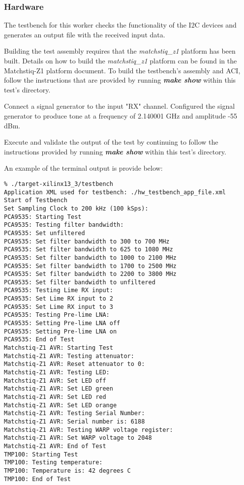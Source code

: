 \documentclass{article}
\begin{document}
\subsubsection*{Hardware}
\begin{flushleft}
The testbench for this worker checks the functionality of the I2C devices and generates an output file with the received input data. \\ \medskip

Building the test assembly requires that the \textit{matchstiq\_z1} platform has been built. Details on how to build the \textit{matchstiq\_z1} platform can be found in the Matchstiq-Z1 platform document. To build the testbench's assembly and ACI, follow the instructions that are provided by running \textbf{\textit{make show}} within this test's directory.\\ \medskip

Connect a signal generator to the input "RX" channel. Configured the signal generator to produce tone at a frequency of 2.140001 GHz and amplitude -55 dBm.\\ \medskip

Execute and validate the output of the test by continuing to follow the instructions provided by running \textbf{\textit{make show}} within this test's directory.\\ \medskip

An example of the terminal output is provide below:

\begin{lstlisting}
% ./target-xilinx13_3/testbench                 
Application XML used for testbench: ./hw_testbench_app_file.xml
Start of Testbench
Set Sampling Clock to 200 kHz (100 kSps): 
PCA9535: Starting Test 
PCA9535: Testing filter bandwidth: 
PCA9535: Set unfiltered
PCA9535: Set filter bandwidth to 300 to 700 MHz
PCA9535: Set filter bandwidth to 625 to 1080 MHz
PCA9535: Set filter bandwidth to 1000 to 2100 MHz
PCA9535: Set filter bandwidth to 1700 to 2500 MHz
PCA9535: Set filter bandwidth to 2200 to 3800 MHz
PCA9535: Set filter bandwidth to unfiltered
PCA9535: Testing Lime RX input:
PCA9535: Set Lime RX input to 2
PCA9535: Set Lime RX input to 3
PCA9535: Testing Pre-lime LNA:
PCA9535: Setting Pre-lime LNA off
PCA9535: Setting Pre-lime LNA on 
PCA9535: End of Test 
Matchstiq-Z1 AVR: Starting Test 
Matchstiq-Z1 AVR: Testing attenuator:
Matchstiq-Z1 AVR: Reset attenuator to 0:
Matchstiq-Z1 AVR: Testing LED:
Matchstiq-Z1 AVR: Set LED off
Matchstiq-Z1 AVR: Set LED green
Matchstiq-Z1 AVR: Set LED red
Matchstiq-Z1 AVR: Set LED orange
Matchstiq-Z1 AVR: Testing Serial Number:
Matchstiq-Z1 AVR: Serial number is: 6188
Matchstiq-Z1 AVR: Testing WARP voltage register: 
Matchstiq-Z1 AVR: Set WARP voltage to 2048
Matchstiq-Z1 AVR: End of Test 
TMP100: Starting Test 
TMP100: Testing temperature:
TMP100: Temperature is: 42 degrees C
TMP100: End of Test 
\end{lstlisting}


\end{flushleft}
\end{document}
